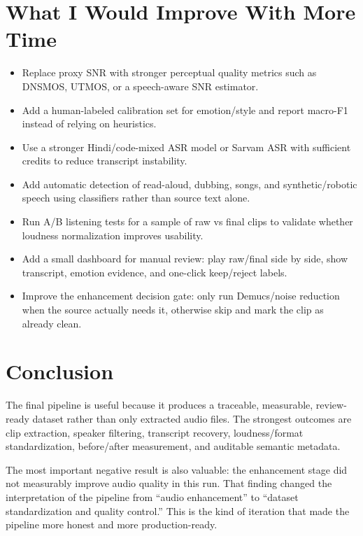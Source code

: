 \documentclass[11pt]{article}
\begin{document}
\section{What I Would Improve With More Time}

\begin{itemize}
    \item Replace proxy SNR with stronger perceptual quality metrics such as DNSMOS, UTMOS, or a speech-aware SNR estimator.
    \item Add a human-labeled calibration set for emotion/style and report macro-F1 instead of relying on heuristics.
    \item Use a stronger Hindi/code-mixed ASR model or Sarvam ASR with sufficient credits to reduce transcript instability.
    \item Add automatic detection of read-aloud, dubbing, songs, and synthetic/robotic speech using classifiers rather than source text alone.
    \item Run A/B listening tests for a sample of raw vs final clips to validate whether loudness normalization improves usability.
    \item Add a small dashboard for manual review: play raw/final side by side, show transcript, emotion evidence, and one-click keep/reject labels.
    \item Improve the enhancement decision gate: only run Demucs/noise reduction when the source actually needs it, otherwise skip and mark the clip as already clean.
\end{itemize}

\section{Conclusion}

The final pipeline is useful because it produces a traceable, measurable, review-ready dataset rather than only extracted audio files. The strongest outcomes are clip extraction, speaker filtering, transcript recovery, loudness/format standardization, before/after measurement, and auditable semantic metadata.

The most important negative result is also valuable: the enhancement stage did not measurably improve audio quality in this run. That finding changed the interpretation of the pipeline from ``audio enhancement'' to ``dataset standardization and quality control.'' This is the kind of iteration that made the pipeline more honest and more production-ready.
\end{document}
